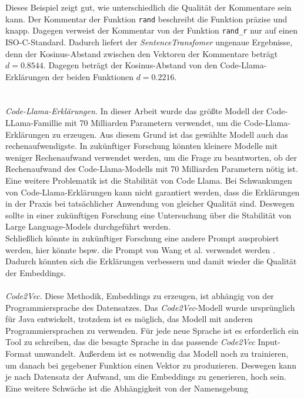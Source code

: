 \documentclass[12pt,letterpaper,ngerman]{article}
\begin{document}
Dieses Beispiel zeigt gut, wie unterschiedlich die Qualität 
der Kommentare sein kann. Der Kommentar der Funktion \texttt{rand}
beschreibt die Funktion präzise und knapp. Dagegen verweist der 
Kommentar von der Funktion \texttt{rand\_r} nur auf einen 
ISO-C-Standard. Dadurch liefert der \textit{SentenceTransfomer}
ungenaue Ergebnisse, denn der Kosinus-Abstand zwischen
den Vektoren der Kommentare beträgt $d = 0.8544$.
Dagegen beträgt der Kosinus-Abstand von den Code-Llama-Erklärungen
der beiden Funktionen $d = 0.2216$.\\
\hfill\\
\pagebreak
\hfill\\
\textit{Code-Llama-Erklärungen.}
In dieser Arbeit wurde das größte Modell der Code-LLama-Famillie 
mit 70 Milliarden Parametern verwendet, um die 
Code-Llama-Erklärungen zu erzeugen. Aus diesem Grund ist das
gewählte Modell auch das rechenaufwendigste. In zukünftiger 
Forschung könnten kleinere Modelle mit weniger Rechenaufwand 
verwendet werden, um die Frage zu beantworten, ob der Rechenaufwand 
des Code-Llama-Modells mit 70 Milliarden Parametern nötig ist. \\
Eine weitere Problematik ist die Stabilität von Code Llama.
Bei Schwankungen von Code-Llama-Erklärungen kann nicht garantiert 
werden, dass die Erklärungen in der Praxis bei tatsächlicher 
Anwendung von gleicher Qualität sind. Deswegen sollte in
einer zukünftigen Forschung eine Untersuchung über die 
Stabilität von Large Language-Models durchgeführt werden.\\ 
Schließlich könnte in zukünftiger Forschung eine andere 
Prompt ausprobiert werden, hier könnte bspw. die 
Prompt von Wang et al. verwendet werden 
\cite{clap}. Dadurch könnten sich die Erklärungen 
verbessern und damit wieder die Qualität der 
Embeddings.\\\\
\textit{Code2Vec}. 
Diese Methodik, Embeddings zu erzeugen,
ist abhängig von der Programmiersprache des Datensatzes.  
Das \textit{Code2Vec}-Modell wurde ursprünglich für Java entwickelt,
trotzdem ist es möglich, das Modell mit anderen Programmiersprachen
zu verwenden. Für jede neue Sprache ist es erforderlich ein
Tool zu schreiben, das die besagte Sprache in das passende 
\textit{Code2Vec} Input-Format umwandelt. Außerdem ist es 
notwendig das Modell noch zu trainieren, um danach bei 
gegebener Funktion einen Vektor zu produzieren. Deswegen 
kann je nach Datensatz der Aufwand,
um die Embeddings zu generieren, hoch sein. \\
Eine weitere Schwäche ist die Abhängigkeit von der Namensgebung 
\end{document}
